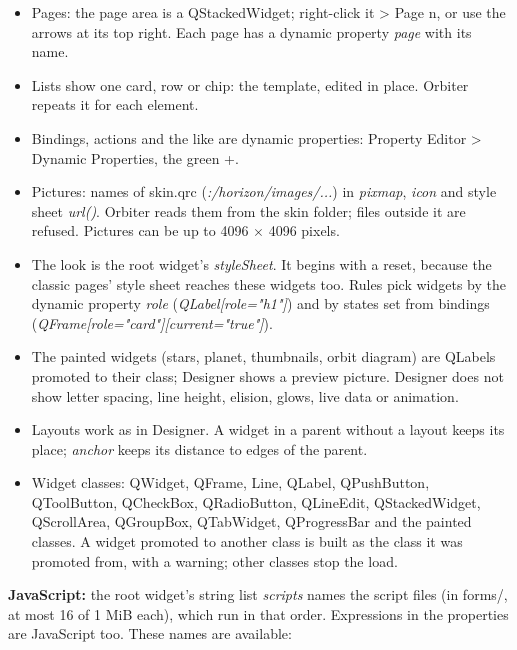 \documentclass[Orbiter Developer Manual.tex]{subfiles}
\begin{document}
\begin{sloppypar}
\begin{itemize}
\item Pages: the page area is a QStackedWidget; right-click it > Page n, or use the arrows at its top right. Each page has a dynamic property \textit{page} with its name.
\item Lists show one card, row or chip: the template, edited in place. Orbiter repeats it for each element.
\item Bindings, actions and the like are dynamic properties: Property Editor > Dynamic Properties, the green +.
\item Pictures: names of skin.qrc (\textit{:/horizon/images/...}) in \textit{pixmap}, \textit{icon} and style sheet \textit{url()}. Orbiter reads them from the skin folder; files outside it are refused. Pictures can be up to 4096 $\times$ 4096 pixels.
\item The look is the root widget's \textit{styleSheet}. It begins with a reset, because the classic pages' style sheet reaches these widgets too. Rules pick widgets by the dynamic property \textit{role} (\textit{QLabel[role="h1"]}) and by states set from bindings (\textit{QFrame[role="card"][current="true"]}).
\item The painted widgets (stars, planet, thumbnails, orbit diagram) are QLabels promoted to their class; Designer shows a preview picture. Designer does not show letter spacing, line height, elision, glows, live data or animation.
\item Layouts work as in Designer. A widget in a parent without a layout keeps its place; \textit{anchor} keeps its distance to edges of the parent.
\item Widget classes: QWidget, QFrame, Line, QLabel, QPushButton, QToolButton, QCheckBox, QRadioButton, QLineEdit, QStackedWidget, QScrollArea, QGroupBox, QTabWidget, QProgressBar and the painted classes. A widget promoted to another class is built as the class it was promoted from, with a warning; other classes stop the load.
\end{itemize}

\noindent
\textbf{JavaScript:} the root widget's string list \textit{scripts} names the script files (in forms/, at most 16 of 1 MiB each), which run in that order. Expressions in the properties are JavaScript too. These names are available:


\end{sloppypar}
\end{document}
